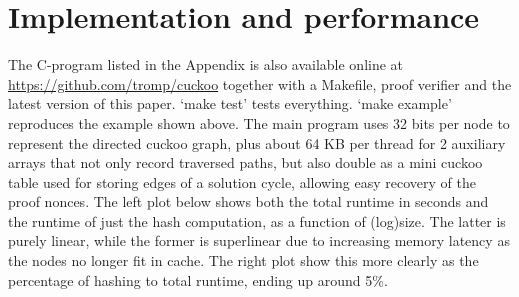 \documentclass[11pt, oneside]{article}
\begin{document}
\section{Implementation and performance}
The C-program listed in the Appendix is also available online at
\url{https://github.com/tromp/cuckoo} together with a Makefile,
proof verifier and the latest version of this paper. `make test' tests everything.
`make example' reproduces the example shown above.
The main program uses 32 bits per node to represent the directed cuckoo graph,
plus about 64 KB per thread for 2 auxiliary arrays that not only record traversed paths,
but also double as a mini cuckoo table used for storing edges of a solution cycle,
allowing easy recovery of the proof nonces.
The left plot below shows both the total runtime in seconds and the runtime of just
the hash computation, as a function of (log)size. The latter is purely
linear, while the former is superlinear due to increasing memory latency
as the nodes no longer fit in cache. The right plot show this more clearly
as the percentage of hashing to total runtime, ending up around 5\%.

\begin{center}
\hspace{1cm}
\end{center}
\end{document}
